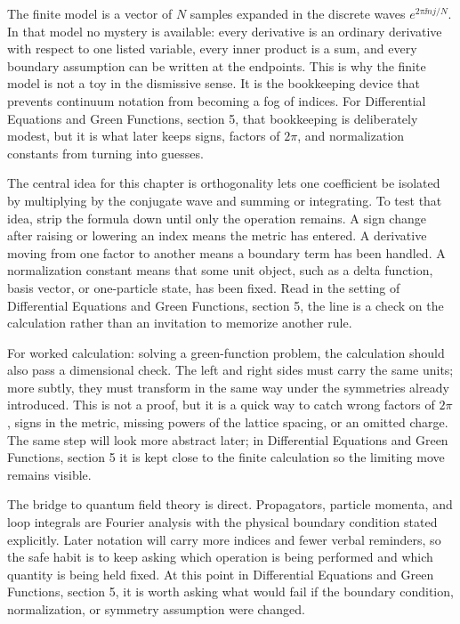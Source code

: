 The finite model is a vector of \(N\) samples expanded in the discrete waves \(e^{2\pi \ii nj/N}\).  In that model no mystery is available: every derivative is an ordinary derivative with respect to one listed variable, every inner product is a sum, and every boundary assumption can be written at the endpoints.  This is why the finite model is not a toy in the dismissive sense.  It is the bookkeeping device that prevents continuum notation from becoming a fog of indices.  For Differential Equations and Green Functions, section 5, that bookkeeping is deliberately modest, but it is what later keeps signs, factors of \(2\pi\), and normalization constants from turning into guesses.

The central idea for this chapter is orthogonality lets one coefficient be isolated by multiplying by the conjugate wave and summing or integrating.  To test that idea, strip the formula down until only the operation remains.  A sign change after raising or lowering an index means the metric has entered.  A derivative moving from one factor to another means a boundary term has been handled.  A normalization constant means that some unit object, such as a delta function, basis vector, or one-particle state, has been fixed.  Read in the setting of Differential Equations and Green Functions, section 5, the line is a check on the calculation rather than an invitation to memorize another rule.

For worked calculation: solving a green-function problem, the calculation should also pass a dimensional check.  The left and right sides must carry the same units; more subtly, they must transform in the same way under the symmetries already introduced.  This is not a proof, but it is a quick way to catch wrong factors of \(2\pi\), signs in the metric, missing powers of the lattice spacing, or an omitted charge.  The same step will look more abstract later; in Differential Equations and Green Functions, section 5 it is kept close to the finite calculation so the limiting move remains visible.

The bridge to quantum field theory is direct.  Propagators, particle momenta, and loop integrals are Fourier analysis with the physical boundary condition stated explicitly.  Later notation will carry more indices and fewer verbal reminders, so the safe habit is to keep asking which operation is being performed and which quantity is being held fixed.  At this point in Differential Equations and Green Functions, section 5, it is worth asking what would fail if the boundary condition, normalization, or symmetry assumption were changed.

